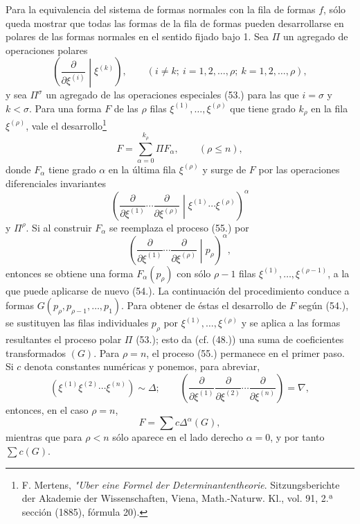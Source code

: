 \documentclass[11pt]{article}
\begin{document}
Para la equivalencia del sistema de formas normales con la fila de formas $f$, sólo queda mostrar que todas las formas de la fila de formas pueden desarrollarse en polares de las formas normales en el sentido fijado bajo 1. Sea $\Pi$ un agregado de operaciones polares
\begin{equation}
 \left(\frac{\partial}{\partial\xi^{(i)}}\middle|\xi^{(k)}\right),
 \qquad (i\ne k;\ i=1,2,\ldots,\rho;\ k=1,2,\ldots,\rho),
\tag{53}
\end{equation}
y sea $\Pi^\sigma$ un agregado de las operaciones especiales (53.) para las que $i=\sigma$ y $k<\sigma$. Para una forma $F$ de las $\rho$ filas $\xi^{(1)},\ldots,\xi^{(\rho)}$ que tiene grado $k_\rho$ en la fila $\xi^{(\rho)}$, vale el desarrollo\footnote{F. Mertens, \emph{"Uber eine Formel der Determinantentheorie}. Sitzungsberichte der Akademie der Wissenschaften, Viena, Math.-Naturw. Kl., vol. 91, 2.ª sección (1885), fórmula 20).}
\begin{equation}
 F=\sum_{\alpha=0}^{k_\rho}\Pi F_\alpha,
 \qquad(\rho\le n),
\tag{54}
\end{equation}
donde $F_\alpha$ tiene grado $\alpha$ en la última fila $\xi^{(\rho)}$ y surge de $F$ por las operaciones diferenciales invariantes
\begin{equation}
 \left(\frac{\partial}{\partial\xi^{(1)}}\cdots\frac{\partial}{\partial\xi^{(\rho)}}\middle|\xi^{(1)}\cdots\xi^{(\rho)}\right)^\alpha
\tag{55}
\end{equation}
y $\Pi^\rho$. Si al construir $F_\alpha$ se reemplaza el proceso (55.) por
\begin{equation}
 \left(\frac{\partial}{\partial\xi^{(1)}}\cdots\frac{\partial}{\partial\xi^{(\rho)}}\middle|p_\rho\right)^\alpha,
\tag{56}
\end{equation}
entonces se obtiene una forma $F_\alpha(p_\rho)$ con sólo $\rho-1$ filas $\xi^{(1)},\ldots,\xi^{(\rho-1)}$, a la que puede aplicarse de nuevo (54.). La continuación del procedimiento conduce a formas $G(p_\rho,p_{\rho-1},\ldots,p_1)$. Para obtener de éstas el desarrollo de $F$ según (54.), se sustituyen las filas individuales $p_\rho$ por $\xi^{(1)},\ldots,\xi^{(\rho)}$ y se aplica a las formas resultantes el proceso polar $\Pi$ (53.); esto da (cf. (48.)) una suma de coeficientes transformados $(G)$. Para $\rho=n$, el proceso (55.) permanece en el primer paso. Si $c$ denota constantes numéricas y ponemos, para abreviar,
\begin{equation}
 (\xi^{(1)}\xi^{(2)}\cdots\xi^{(n)})\sim\Delta;
 \qquad
 \left(\frac{\partial}{\partial\xi^{(1)}}\frac{\partial}{\partial\xi^{(2)}}\cdots\frac{\partial}{\partial\xi^{(n)}}\right)=\nabla,
\tag{57}
\end{equation}
entonces, en el caso $\rho=n$,
\begin{equation}
 F=\sum c\Delta^\alpha(G),
\tag{58}
\end{equation}
mientras que para $\rho<n$ sólo aparece en el lado derecho $\alpha=0$, y por tanto $\sum c(G)$.
\end{document}
